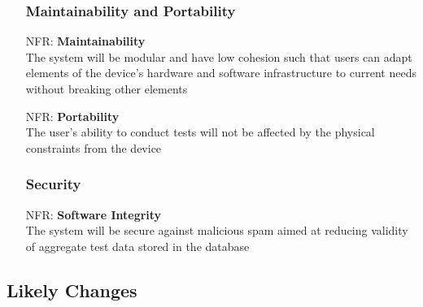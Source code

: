 \documentclass[12pt]{article}
\newcounter{nfrnum} %
\begin{document}
\begin{itemize}
\subsubsection{Maintainability and Portability}

    \item[NFR\refstepcounter{nfrnum}\thenfrnum:]
      \textbf{Maintainability}\\
    The system will be modular and have low cohesion such that users can adapt elements of the device's hardware and software infrastructure to current needs without breaking other elements

    \item[NFR\refstepcounter{nfrnum}\thenfrnum:]
    \textbf{Portability}\\
    The user's ability to conduct tests will not be affected by the physical constraints from the device
  
\subsubsection{Security}

    \item[NFR\refstepcounter{nfrnum}\thenfrnum:]
    \textbf{Software Integrity}\\
    The system will be secure against malicious spam aimed at reducing validity of aggregate test data stored in the database

\end{itemize}


\subsection{Likely Changes}    
\end{document}
